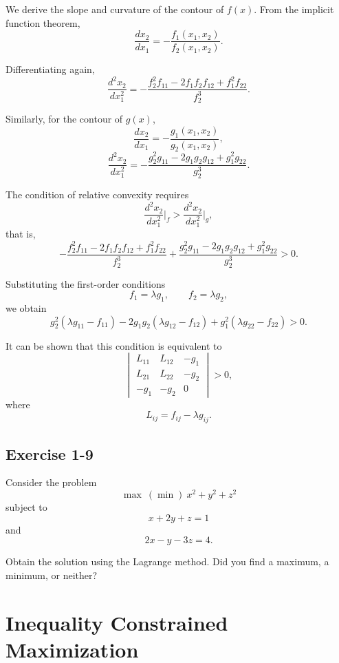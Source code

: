 \medskip

We derive the slope and curvature of the contour of $f(x)$.
From the implicit function theorem,
\[
\frac{dx_2}{dx_1}
=
-\frac{f_1(x_1,x_2)}{f_2(x_1,x_2)}.
\]

Differentiating again,
\[
\frac{d^2 x_2}{dx_1^2}
=
-\frac{
f_2^2 f_{11}
-2 f_1 f_2 f_{12}
+ f_1^2 f_{22}
}{f_2^3}.
\]

Similarly, for the contour of $g(x)$,
\[
\frac{dx_2}{dx_1}
=
-\frac{g_1(x_1,x_2)}{g_2(x_1,x_2)},
\]
\[
\frac{d^2 x_2}{dx_1^2}
=
-\frac{
g_2^2 g_{11}
-2 g_1 g_2 g_{12}
+ g_1^2 g_{22}
}{g_2^3}.
\]

\medskip

The condition of relative convexity requires
\[
\frac{d^2 x_2}{dx_1^2}\Big|_{f}
>
\frac{d^2 x_2}{dx_1^2}\Big|_{g},
\]
that is,
\[
-\frac{
f_2^2 f_{11}
-2 f_1 f_2 f_{12}
+ f_1^2 f_{22}
}{f_2^3}
+
\frac{
g_2^2 g_{11}
-2 g_1 g_2 g_{12}
+ g_1^2 g_{22}
}{g_2^3}
> 0.
\]

\medskip

Substituting the first-order conditions
\[
f_1 = \lambda g_1,
\qquad
f_2 = \lambda g_2,
\]
we obtain
\[
g_2^2 (\lambda g_{11} - f_{11})
- 2 g_1 g_2 (\lambda g_{12} - f_{12})
+ g_1^2 (\lambda g_{22} - f_{22})
> 0.
\]

It can be shown that this condition is equivalent to
\[
\begin{vmatrix}
L_{11} & L_{12} & -g_1 \\
L_{21} & L_{22} & -g_2 \\
-g_1 & -g_2 & 0
\end{vmatrix}
> 0,
\]
where
\[
L_{ij} = f_{ij} - \lambda g_{ij}.
\]


\begin{tcolorbox}[breakable]

\subsection*{Exercise 1-9}

Consider the problem
\[
\max \ (\min)\ x^2 + y^2 + z^2
\]
subject to
\[
x + 2y + z = 1
\]
and
\[
2x - y - 3z = 4.
\]

Obtain the solution using the Lagrange method.
Did you find a maximum, a minimum, or neither?

\end{tcolorbox}


\section{Inequality Constrained Maximization}

